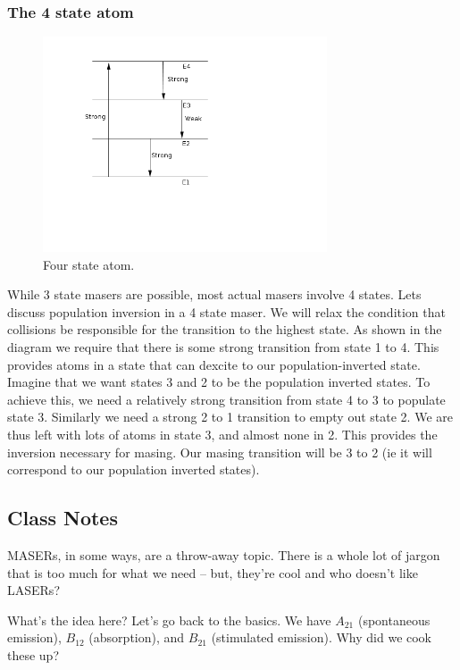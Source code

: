 \documentclass{article}
\def\ato{{A_{21}}}
\def\bto{{B_{21}}}
\def\bot{{B_{12}}}
\def\ato{{A_{21}}}
\def\bto{{B_{21}}}
\def\bot{{B_{12}}}
\def\ato{{A_{21}}}
\def\bto{{B_{21}}}
\def\bot{{B_{12}}}
\begin{document}
\subsubsection{The 4 state atom}

\begin{figure}
    \centering
    \includegraphics[width=0.75\textwidth]{4state.png}
    \caption{Four state atom.}
    \label{fig:4state}
\end{figure}

While 3 state masers are possible, most actual masers involve 4 states. Lets discuss population inversion in a 4 state maser. We will relax the condition that collisions
be responsible for the transition to the highest state. As shown in the diagram we require that there is some strong transition from state 1 to 4. This provides atoms in a state that can dexcite to our population-inverted state. Imagine that we want states 3 and 2 to be the population inverted states. To achieve this, we need a relatively strong transition from state 4 to 3 to populate state 3. Similarly we need a strong 2 to 1 transition to empty out state 2. We are thus left with lots of atoms in state 3, and almost none in 2. This provides the inversion necessary for masing. Our masing transition will be 3 to 2 (ie it will correspond to our population inverted states).

\subsection{Class Notes}

MASERs, in some ways, are a throw-away topic. There is a whole lot of jargon that is too much for what we need -- but, they're cool and who doesn't like LASERs? 

What's the idea here? Let's go back to the basics. We have $\ato$ (spontaneous emission), $\bot$ (absorption), and $\bto$ (stimulated emission). Why did we cook these up? 
\end{document}
